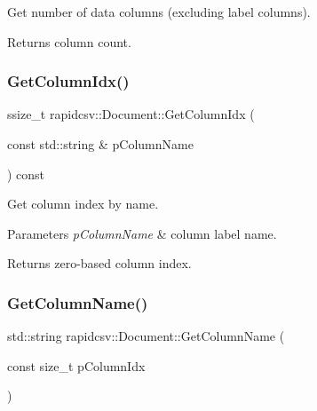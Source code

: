 Get number of data columns (excluding label columns). 

\begin{DoxyReturn}{Returns}
column count. 
\end{DoxyReturn}
\mbox{\label{classrapidcsv_1_1Document_a097839da89b8be79bbd0a346a0bb7509}} 
\subsubsection{\texorpdfstring{Get\+Column\+Idx()}{GetColumnIdx()}}
{\footnotesize\ttfamily ssize\+\_\+t rapidcsv\+::\+Document\+::\+Get\+Column\+Idx (\begin{DoxyParamCaption}\item[{const std\+::string \&}]{p\+Column\+Name }\end{DoxyParamCaption}) const\hspace{0.3cm}{\ttfamily [inline]}}



Get column index by name. 


\begin{DoxyParams}{Parameters}
{\em p\+Column\+Name} & column label name. \\
\hline
\end{DoxyParams}
\begin{DoxyReturn}{Returns}
zero-\/based column index. 
\end{DoxyReturn}
\mbox{\label{classrapidcsv_1_1Document_a9fca205870e1d9237f6b4bf0634ceb9c}} 
\subsubsection{\texorpdfstring{Get\+Column\+Name()}{GetColumnName()}}
{\footnotesize\ttfamily std\+::string rapidcsv\+::\+Document\+::\+Get\+Column\+Name (\begin{DoxyParamCaption}\item[{const size\+\_\+t}]{p\+Column\+Idx }\end{DoxyParamCaption})\hspace{0.3cm}{\ttfamily [inline]}}



